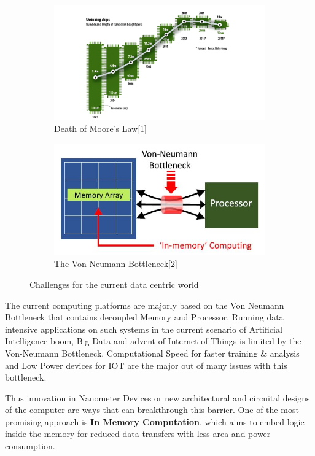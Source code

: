 \begin{figure}[h]
\begin{subfigure}{0.5\textwidth}
\includegraphics[width=0.9\linewidth]{chapters/chapter01/moore.png} 
\caption{Death of Moore's Law[1]}
\label{fig:Figure}
\end{subfigure}
\begin{subfigure}{0.5\textwidth}
\includegraphics[width=0.9\linewidth]{fig1.JPG}
\caption{The Von-Neumann Bottleneck[2]}
\label{fig:Figure}
\end{subfigure}
 
\caption{Challenges for the current data centric world}
\label{fig:Figure}
\end{figure}


The current computing platforms are majorly based on the Von Neumann Bottleneck that contains decoupled Memory and Processor. Running data intensive applications on such systems in the current scenario of Artificial Intelligence boom, Big Data and advent of Internet of Things is limited by the Von-Neumann Bottleneck. Computational Speed for faster training \& analysis and Low Power devices for IOT are the major out of many issues with this bottleneck. 

Thus innovation in Nanometer Devices or new architectural and circuital designs of the computer are ways that can breakthrough this barrier. One of the most promising approach is \textbf{In Memory Computation}, which aims to embed logic inside the memory for reduced data transfers with less area and power consumption.

